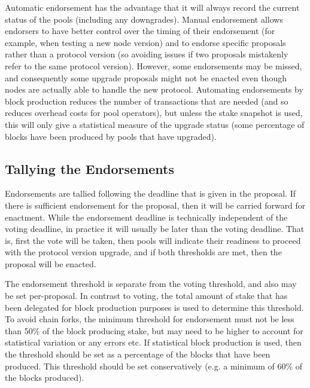 Automatic endorsement has the advantage that it will always record the current
status of the pools (including any downgrades).
Manual endorsement allows endorsers to have better control over
the timing of their endorsement (for example, when testing a new node version)
and to endorse specific proposals rather than a protocol version (so avoiding issues if two proposals
mistakenly refer to the same protocol version).  However, some
endorsements may be missed, and consequently some upgrade proposals might not be enacted
even though nodes are actually able to handle the new protocol.
Automating endorsements by block production reduces the number of transactions that are needed (and so reduces overhead costs for pool operators),
but unless the stake snapshot is used, this will only give a statistical measure of the upgrade status (some percentage of blocks have been produced by
pools that have upgraded).

\subsection{Tallying the Endorsements}

Endorsements are tallied following the deadline that is given in the proposal.
If there is sufficient endorsement for the proposal, then it will be carried
forward for enactment.  While the endorsement deadline is technically
independent of the voting deadline, in practice it will usually be later than the
voting deadline. That is, first the vote will be taken, then pools will indicate
their readiness to proceed with the protocol version upgrade, and if both thresholds are met,
then the proposal will be enacted.

The endorsement threshold is separate from the voting threshold, and also
may be set per-proposal.  %
In contrast to voting, the total amount of stake that has been delegated for block production purposes is used to determine this
threshold. %
To avoid chain forks, the minimum threshold for endorsement must not be less than 50\%
of the block producing stake, but may need to be higher to account for statistical variation or any errors etc.
If statistical block production is used, then the threshold should be set as a percentage of the blocks that have been produced.
This threshold should be set conservatively (e.g. a minimum of 60\% of the blocks produced).
